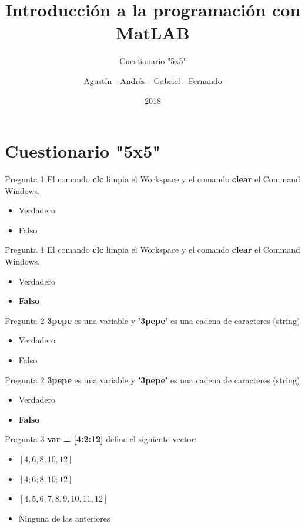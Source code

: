 \documentclass{bredelebeamer}
\title[Programación en MatLAB]{Introducción a la programación con MatLAB}
\subtitle{Cuestionario "5x5"}
\author{Agustín - Andrés - Gabriel - Fernando\inst{1}}
\institute[UTN.BA]
{
  \inst{1}%
  Universidad Tecnológica Nacional\\
  Facultad Regional Buenos Aires
  }
\date{2018}
\begin{document}
\begin{frame}
  \titlepage 
\end{frame}




\section{Cuestionario "5x5"}

\begin{frame}{Pregunta 1}
El comando \textbf{clc} limpia el Workspace y el comando \textbf{clear} el Command Windows.
\begin{itemize}
\item Verdadero
\item Falso
\end{itemize}
\end{frame}

\begin{frame}{Pregunta 1}
El comando \textbf{clc} limpia el Workspace y el comando \textbf{clear} el Command Windows.
\begin{itemize}
\item Verdadero
\item \textbf{Falso}
\end{itemize}
\end{frame}

\begin{frame}{Pregunta 2}
\textbf{3pepe} es una variable y \textbf{'3pepe'} es una cadena de caracteres (string)
\begin{itemize}
\item Verdadero
\item Falso
\end{itemize}
\end{frame}

\begin{frame}{Pregunta 2}
\textbf{3pepe} es una variable y \textbf{'3pepe'} es una cadena de caracteres (string)
\begin{itemize}
\item Verdadero
\item \textbf{Falso}
\end{itemize}
\end{frame}

\begin{frame}{Pregunta 3}
\textbf{var = [4:2:12]} define el siguiente vector:
\begin{itemize}
\item $[4, 6, 8, 10, 12]$
\item $[4; 6; 8; 10; 12]$
\item $[4,5,6,7,8,9,10,11,12]$
\item Ninguna de las anteriores
\end{itemize}
\end{frame}
\end{document}
